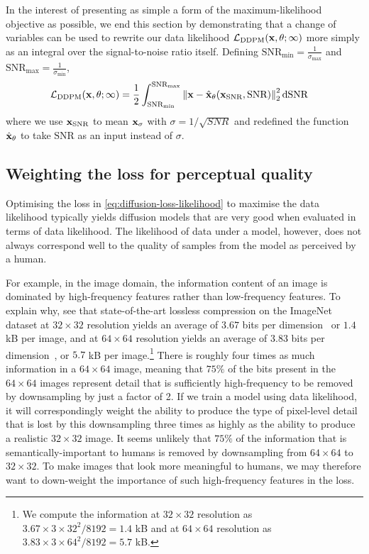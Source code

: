 In the interest of presenting as simple a form of the maximum-likelihood objective as possible, we end this section by demonstrating that a change of variables can be used to rewrite our data likelihood ${\mathcal{L}}_\text{DDPM}({\mathbf{x}}, \theta; \infty)$ more simply as an integral over the signal-to-noise ratio itself. Defining $\text{SNR}_\text{min} = \frac{1}{\sigma_\text{max}}$ and $\text{SNR}_\text{max} = \frac{1}{\sigma_\text{min}}$,
\begin{align}
    {\mathcal{L}}_\text{DDPM}({\mathbf{x}}, \theta; \infty) &= \frac{1}{2} \int_{\text{SNR}_\text{min}}^{\text{SNR}_\text{max}} \left\| {\mathbf{x}} - \hat{{\mathbf{x}}}_\theta({\mathbf{x}}_\text{SNR}, \text{SNR}) \right\|_2^2 \mathrm{d}\text{SNR} \label{eq:diffusion-integral-dsnr}
\end{align}
where we use ${\mathbf{x}}_\text{SNR}$ to mean ${\mathbf{x}}_\sigma$ with $\sigma = 1 / \sqrt{SNR}$ and redefined the function $\hat{{\mathbf{x}}}_\theta$ to take $\text{SNR}$ as an input instead of $\sigma$.


\subsection{Weighting the loss for perceptual quality} \label{sec:diffusion-perceptual-quality}
Optimising the loss in \cref{eq:diffusion-loss-likelihood} to maximise the data likelihood typically yields diffusion models that are very good when evaluated in terms of data likelihood. The likelihood of data under a model, however, does not always correspond well to the quality of samples from the model as perceived by a human. 

For example, in the image domain, the information content of an image is dominated by high-frequency features rather than low-frequency features. To explain why, see that state-of-the-art lossless compression on the ImageNet dataset at $32\times32$ resolution yields an average of $3.67$ bits per dimension~\citep{sahoo2023diffusion} or $1.4$ kB per image, and at $64\times64$ resolution yields an average of 3.83 bits per dimension~\citep{finlay2020train}, or $5.7$ kB per image.\footnote{We compute the information at $32\times32$ resolution as $3.67\times3\times32^2 / 8192 = 1.4$ kB and at $64\times64$ resolution as $3.83\times3\times64^2 / 8192 = 5.7$ kB.} There is roughly four times as much information in a $64\times64$ image, meaning that $75\%$ of the bits present in the $64\times64$ images represent detail that is sufficiently high-frequency to be removed by downsampling by just a factor of 2. If we train a model using data likelihood, it will correspondingly weight the ability to produce the type of pixel-level detail that is lost by this downsampling three times as highly as the ability to produce a realistic $32\times32$ image. It seems unlikely that $75\%$ of the information that is semantically-important to humans is removed by downsampling from $64\times64$ to $32\times32$. To make images that look more meaningful to humans, we may therefore want to down-weight the importance of such high-frequency features in the loss.

